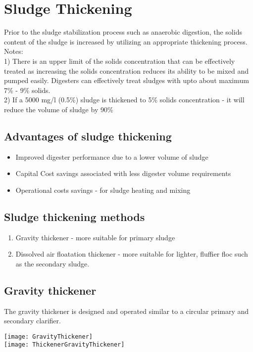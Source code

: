 
\chapter{Sludge Thickening}

			Prior to the sludge stabilization process such as anaerobic digestion, the solids content of the sludge is increased by utilizing an appropriate thickening process.\\
			Notes:\\
			1) There is an upper limit of the solids concentration that can be effectively treated as increasing the solids concentration reduces its ability to be mixed and pumped easily. Digesters can effectively treat sludges with upto about maximum 7\% - 9\% solids.\\
			2) If a 5000 mg/l (0.5\%) sludge is thickened to 5\% solids concentration - it will reduce the volume of sludge by 90\%\\

\section{Advantages of sludge thickening}

		\begin{itemize}
			\item Improved digester performance due to a lower volume of sludge
			\item Capital Cost savings associated with less digester volume requirements
			\item Operational costs savings - for sludge heating and mixing
		\end{itemize}
        
\section{Sludge thickening methods}

		\begin{enumerate}
			\item Gravity thickener - more suitable for primary sludge
			\item Dissolved air floatation thickener - more suitable for lighter, fluffier floc such as the secondary sludge.
		\end{enumerate}
\section{Gravity thickener}
The gravity thickener is designed and operated similar to a circular primary and secondary clarifier.
\begin{center}
\texttt{[image: GravityThickener]}\\
\vspace{1cm}
\texttt{[image: ThickenerGravityThickener]}
\vspace{1cm}
\end{center}
